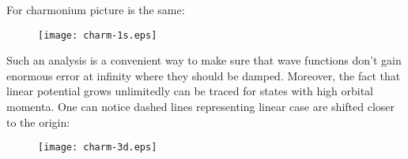 For charmonium picture is the same:

\begin{figure}[H] \begin{floatrow}
        {\texttt{[image: charm-1s.eps]}}
\end{floatrow} \end{figure}

Such an analysis is a convenient way to make sure that wave functions don't gain enormous error at infinity where they should be damped. Moreover, the fact that linear potential grows unlimitedly can be traced for states with high orbital momenta. One can notice dashed lines representing linear case are shifted closer to the origin:

\begin{figure}[H] \begin{floatrow}
    {\texttt{[image: charm-3d.eps]}}
\end{floatrow} \end{figure}
